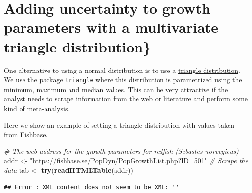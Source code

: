\documentclass[
]{book}
\newenvironment{Shaded}{\begin{snugshade}}{\end{snugshade}}
\newcommand{\CommentTok}[1]{\textcolor[rgb]{0.56,0.35,0.01}{\textit{#1}}}
\newcommand{\FunctionTok}[1]{\textcolor[rgb]{0.13,0.29,0.53}{\textbf{#1}}}
\newcommand{\NormalTok}[1]{#1}
\newcommand{\OtherTok}[1]{\textcolor[rgb]{0.56,0.35,0.01}{#1}}
\newcommand{\StringTok}[1]{\textcolor[rgb]{0.31,0.60,0.02}{#1}}
\begin{document}
\hypertarget{adding-uncertainty-to-growth-parameters-with-a-multivariate-triangle-distribution}{%
\section{Adding uncertainty to growth parameters with a multivariate triangle distribution\}}\label{adding-uncertainty-to-growth-parameters-with-a-multivariate-triangle-distribution}}

\label{sec:growth_triangle_cop}

One alternative to using a normal distribution is to use a \href{http://en.wikipedia.org/wiki/Triangle_distribution}{triangle distribution}. We use the package \href{http://cran.r-project.org/web/packages/triangle/index.html}{\texttt{triangle}} where this distribution is parametrized using the minimum, maximum and median values. This can be very attractive if the analyst needs to scrape information from the web or literature and perform some kind of meta-analysis.

Here we show an example of setting a triangle distribution with values taken from Fishbase.

\begin{Shaded}
\begin{Highlighting}[]
\CommentTok{\# The web address for the growth parameters for redfish (Sebastes norvegicus)}
\NormalTok{addr }\OtherTok{\textless{}{-}} \StringTok{"https://fishbase.se/PopDyn/PopGrowthList.php?ID=501"}
\CommentTok{\# Scrape the data}
\NormalTok{tab }\OtherTok{\textless{}{-}} \FunctionTok{try}\NormalTok{(}\FunctionTok{readHTMLTable}\NormalTok{(addr))}
\end{Highlighting}
\end{Shaded}

\begin{verbatim}
## Error : XML content does not seem to be XML: ''
\end{verbatim}
\end{document}
